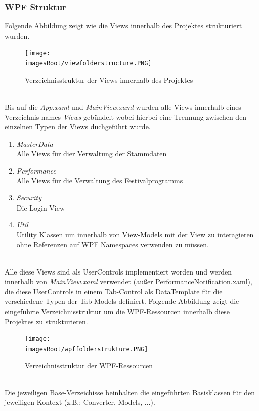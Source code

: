\documentclass[11pt, a4paper, twoside]{article}   	%
\newcommand{\imagesRoot}{images}
\begin{document}
\newpage
\subsubsection{WPF Struktur}
Folgende Abbildung zeigt wie die Views innerhalb des Projektes strukturiert wurden.
\begin{figure}[h]
	\centering
	\texttt{[image: \\imagesRoot/viewfolderstructure.PNG]}
	\caption
	{Verzeichnisstruktur der Views innerhalb des Projektes}
\end{figure}
\ \\
Bis auf die \emph{App.xaml} und \emph{MainView.xaml} wurden alle Views innerhalb eines Verzeichnis names \emph{Views} gebündelt wobei hierbei eine Trennung zwischen den einzelnen Typen der Views duchgeführt wurde.
\begin{enumerate}
	\item\emph{MasterData}\\
	Alle Views für dier Verwaltung der Stammdaten
	\item\emph{Performance}\\
	Alle Views für die Verwaltung des Festivalprogramms
	\item\emph{Security}\\
	Die Login-View
	\item\emph{Util}\\
	Utility Klassen um innerhalb von View-Models mit der View zu interagieren ohne Referenzen auf WPF Namespaces verwenden zu müssen.
\end{enumerate}
\ \\
Alle diese Views sind als UserControls implementiert worden und werden innerhalb von \emph{MainView.xaml} verwendet (außer PerformanceNotification.xaml), die diese UserControls in einem Tab-Control als DataTemplate für die verschiedene Typen der Tab-Models definiert.
\newline
\newpage
Folgende Abbildung zeigt die eingeführte Verzeichnisstruktur um die WPF-Ressourcen innerhalb diese Projektes zu strukturieren.
\begin{figure}[h]
	\centering
	\texttt{[image: \\imagesRoot/wpffolderstrukture.PNG]}
	\caption
	{Verzeichnisstruktur der WPF-Ressourcen}
\end{figure}
\ \\
Die jeweiligen Base-Verzeichisse beinhalten die eingeführten Basisklassen für den jeweiligen Kontext (z.B.: Converter, Models, ...).

\newpage
\end{document}
